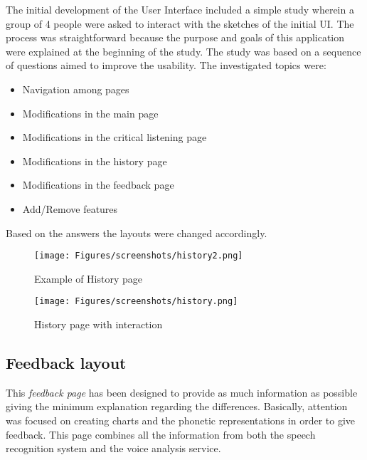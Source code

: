 \noindent The initial development of the User Interface included a simple study wherein a group of 4 people were asked to interact with the sketches of the initial UI. The process was straightforward because the purpose and goals of this application were explained at the beginning of the study. The study was based on a sequence of questions aimed to improve the usability. The investigated topics were:

\begin{itemize}
	\item Navigation among pages
	\item Modifications in the main page
	\item Modifications in the critical listening page
	\item Modifications in the history page
	\item Modifications in the feedback page
	\item Add/Remove features
\end{itemize}

\noindent Based on the answers the layouts were changed accordingly.

\begin{figure}[!ht]
	\centering
	\begin{minipage}{.5\textwidth}
		\centering
		\texttt{[image: Figures/screenshots/history2.png]}
		\caption{Example of History page}
		\label{fig:history2_page}
	\end{minipage}%
	\begin{minipage}{.5\textwidth}
		\centering
		\texttt{[image: Figures/screenshots/history.png]}
		\caption{History page with interaction}
		\label{fig:history_page}
	\end{minipage}
\end{figure}

\subsection{Feedback layout}
\label{ssec:feedback_layout}
This \textit{feedback page} has been designed to provide as much information as possible giving the minimum explanation regarding the differences. Basically, attention was focused on creating charts and the phonetic representations in order to give feedback. This page combines all the information from both the speech recognition system and the voice analysis service. \\

